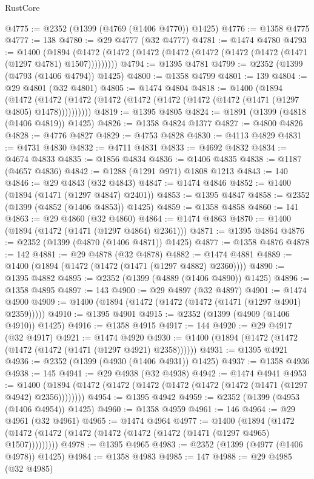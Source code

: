\begin{lexlean}{RustCore}
\begin{coremodule}
{\begin{coremodule}
{{{{{{{{{{{{{{{{{{{{{{{{{{{{{{{{{{{{{{{{{{{{@4775 := @2352 (@1399 (@4769 (@1406 @4770)) @1425)
@4776 := @1358 @4775
@4777 := 138
@4780 := @29 @4777 (@32 @4777)
@4781 := @1474 @4780
@4793 := @1400
    (@1894 (@1472 (@1472 (@1472 (@1472 (@1472 (@1472 (@1472 (@1471 (@1297 @4781) @1507)))))))))
@4794 := @1395 @4781
@4799 := @2352 (@1399 (@4793 (@1406 @4794)) @1425)
@4800 := @1358 @4799
@4801 := 139
@4804 := @29 @4801 (@32 @4801)
@4805 := @1474 @4804
@4818 := @1400
    (@1894
      (@1472 (@1472 (@1472 (@1472 (@1472 (@1472 (@1472 (@1472 (@1471 (@1297 @4805) @1478))))))))))
@4819 := @1395 @4805
@4824 := @1891 (@1399 (@4818 (@1406 @4819)) @1425)
@4826 := @1358 @4824 @1377
@4827 := @4800 @4826
@4828 := @4776 @4827
@4829 := @4753 @4828
@4830 := @4113 @4829
@4831 := @4731 @4830
@4832 := @4711 @4831
@4833 := @4692 @4832
@4834 := @4674 @4833
@4835 := @1856 @4834
@4836 := @1406 @4835
@4838 := @1187 (@4657 @4836)
@4842 := @1288 (@1291 @971) @1808 @1213
@4843 := 140
@4846 := @29 @4843 (@32 @4843)
@4847 := @1474 @4846
@4852 := @1400 (@1894 (@1471 (@1297 @4847) @2401))
@4853 := @1395 @4847
@4858 := @2352 (@1399 (@4852 (@1406 @4853)) @1425)
@4859 := @1358 @4858
@4860 := 141
@4863 := @29 @4860 (@32 @4860)
@4864 := @1474 @4863
@4870 := @1400 (@1894 (@1472 (@1471 (@1297 @4864) @2361)))
@4871 := @1395 @4864
@4876 := @2352 (@1399 (@4870 (@1406 @4871)) @1425)
@4877 := @1358 @4876
@4878 := 142
@4881 := @29 @4878 (@32 @4878)
@4882 := @1474 @4881
@4889 := @1400 (@1894 (@1472 (@1472 (@1471 (@1297 @4882) @2360))))
@4890 := @1395 @4882
@4895 := @2352 (@1399 (@4889 (@1406 @4890)) @1425)
@4896 := @1358 @4895
@4897 := 143
@4900 := @29 @4897 (@32 @4897)
@4901 := @1474 @4900
@4909 := @1400 (@1894 (@1472 (@1472 (@1472 (@1471 (@1297 @4901) @2359)))))
@4910 := @1395 @4901
@4915 := @2352 (@1399 (@4909 (@1406 @4910)) @1425)
@4916 := @1358 @4915
@4917 := 144
@4920 := @29 @4917 (@32 @4917)
@4921 := @1474 @4920
@4930 := @1400 (@1894 (@1472 (@1472 (@1472 (@1472 (@1471 (@1297 @4921) @2358))))))
@4931 := @1395 @4921
@4936 := @2352 (@1399 (@4930 (@1406 @4931)) @1425)
@4937 := @1358 @4936
@4938 := 145
@4941 := @29 @4938 (@32 @4938)
@4942 := @1474 @4941
@4953 := @1400 (@1894 (@1472 (@1472 (@1472 (@1472 (@1472 (@1472 (@1471 (@1297 @4942) @2356))))))))
@4954 := @1395 @4942
@4959 := @2352 (@1399 (@4953 (@1406 @4954)) @1425)
@4960 := @1358 @4959
@4961 := 146
@4964 := @29 @4961 (@32 @4961)
@4965 := @1474 @4964
@4977 := @1400
    (@1894 (@1472 (@1472 (@1472 (@1472 (@1472 (@1472 (@1472 (@1471 (@1297 @4965) @1507)))))))))
@4978 := @1395 @4965
@4983 := @2352 (@1399 (@4977 (@1406 @4978)) @1425)
@4984 := @1358 @4983
@4985 := 147
@4988 := @29 @4985 (@32 @4985)
}}}}}}}}}}}}}}}}}}}}}}}}}}}}}}}}}}}}}}}}}}}}
\end{coremodule}}
\end{coremodule}
\end{lexlean}
